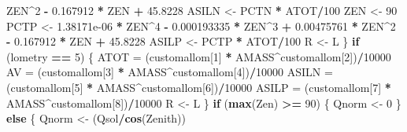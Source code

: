 \documentclass[]{article}
\newenvironment{Shaded}{\begin{snugshade}}{\end{snugshade}}
\newcommand{\KeywordTok}[1]{\textcolor[rgb]{0.13,0.29,0.53}{\textbf{#1}}}
\newcommand{\DecValTok}[1]{\textcolor[rgb]{0.00,0.00,0.81}{#1}}
\newcommand{\FloatTok}[1]{\textcolor[rgb]{0.00,0.00,0.81}{#1}}
\newcommand{\StringTok}[1]{\textcolor[rgb]{0.31,0.60,0.02}{#1}}
\newcommand{\ControlFlowTok}[1]{\textcolor[rgb]{0.13,0.29,0.53}{\textbf{#1}}}
\newcommand{\OperatorTok}[1]{\textcolor[rgb]{0.81,0.36,0.00}{\textbf{#1}}}
\newcommand{\NormalTok}[1]{#1}
\begin{document}
\begin{Shaded}
\begin{Highlighting}[]
\StringTok{            }\NormalTok{ZEN}\OperatorTok{^}\DecValTok{2} \OperatorTok{-}\StringTok{ }\FloatTok{0.167912} \OperatorTok{*}\StringTok{ }\NormalTok{ZEN }\OperatorTok{+}\StringTok{ }\FloatTok{45.8228}
\NormalTok{        ASILN <-}\StringTok{ }\NormalTok{PCTN }\OperatorTok{*}\StringTok{ }\NormalTok{ATOT}\OperatorTok{/}\DecValTok{100}
\NormalTok{        ZEN <-}\StringTok{ }\DecValTok{90}
\NormalTok{        PCTP <-}\StringTok{ }\FloatTok{1.38171e-06} \OperatorTok{*}\StringTok{ }\NormalTok{ZEN}\OperatorTok{^}\DecValTok{4} \OperatorTok{-}\StringTok{ }\FloatTok{0.000193335} \OperatorTok{*}\StringTok{ }\NormalTok{ZEN}\OperatorTok{^}\DecValTok{3} \OperatorTok{+}\StringTok{ }\FloatTok{0.00475761} \OperatorTok{*}\StringTok{ }
\StringTok{            }\NormalTok{ZEN}\OperatorTok{^}\DecValTok{2} \OperatorTok{-}\StringTok{ }\FloatTok{0.167912} \OperatorTok{*}\StringTok{ }\NormalTok{ZEN }\OperatorTok{+}\StringTok{ }\FloatTok{45.8228}
\NormalTok{        ASILP <-}\StringTok{ }\NormalTok{PCTP }\OperatorTok{*}\StringTok{ }\NormalTok{ATOT}\OperatorTok{/}\DecValTok{100}
\NormalTok{        R <-}\StringTok{ }\NormalTok{L}
\NormalTok{    \}}
    \ControlFlowTok{if}\NormalTok{ (lometry }\OperatorTok{==}\StringTok{ }\DecValTok{5}\NormalTok{) \{}
\NormalTok{        ATOT =}\StringTok{ }\NormalTok{(customallom[}\DecValTok{1}\NormalTok{] }\OperatorTok{*}\StringTok{ }\NormalTok{AMASS}\OperatorTok{^}\NormalTok{customallom[}\DecValTok{2}\NormalTok{])}\OperatorTok{/}\DecValTok{10000}
\NormalTok{        AV =}\StringTok{ }\NormalTok{(customallom[}\DecValTok{3}\NormalTok{] }\OperatorTok{*}\StringTok{ }\NormalTok{AMASS}\OperatorTok{^}\NormalTok{customallom[}\DecValTok{4}\NormalTok{])}\OperatorTok{/}\DecValTok{10000}
\NormalTok{        ASILN =}\StringTok{ }\NormalTok{(customallom[}\DecValTok{5}\NormalTok{] }\OperatorTok{*}\StringTok{ }\NormalTok{AMASS}\OperatorTok{^}\NormalTok{customallom[}\DecValTok{6}\NormalTok{])}\OperatorTok{/}\DecValTok{10000}
\NormalTok{        ASILP =}\StringTok{ }\NormalTok{(customallom[}\DecValTok{7}\NormalTok{] }\OperatorTok{*}\StringTok{ }\NormalTok{AMASS}\OperatorTok{^}\NormalTok{customallom[}\DecValTok{8}\NormalTok{])}\OperatorTok{/}\DecValTok{10000}
\NormalTok{        R <-}\StringTok{ }\NormalTok{L}
\NormalTok{    \}}
    \ControlFlowTok{if}\NormalTok{ (}\KeywordTok{max}\NormalTok{(Zen) }\OperatorTok{>=}\StringTok{ }\DecValTok{90}\NormalTok{) \{}
\NormalTok{        Qnorm <-}\StringTok{ }\DecValTok{0}
\NormalTok{    \}}
    \ControlFlowTok{else}\NormalTok{ \{}
\NormalTok{        Qnorm <-}\StringTok{ }\NormalTok{(Qsol}\OperatorTok{/}\KeywordTok{cos}\NormalTok{(Zenith))}

\end{Highlighting}
\end{Shaded}
\end{document}
